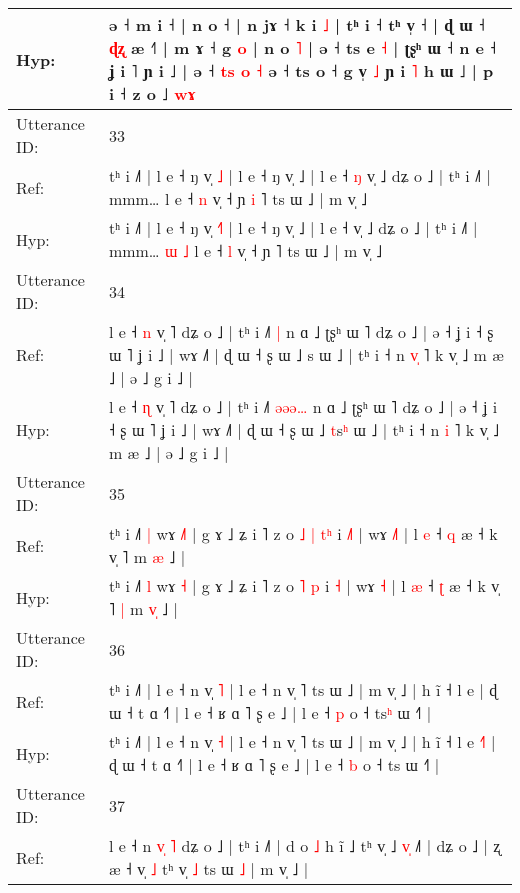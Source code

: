 \documentclass[10pt]{article}
\DeclareRobustCommand{\hl}[1]{{\textcolor{red}{#1}}}
\begin{document}
\begin{longtable}{ll}
 \\
Hyp: & ə ˧ m i ˧ | n o ˧ | n jɤ ˧ k i \hl{˩} | tʰ i ˧ tʰ v̩ ˧ | ɖ ɯ ˧ \hl{ɖ}\hl{ʐ} æ ˧˥ | m ɤ ˧ g\hl{}\hl{}\hl{} \hl{o} | n o \hl{˥} | ə ˧ ts e \hl{˧} | ʈʂʰ ɯ ˧ n e ˧ ʝ i ˥ ɲ i ˩ | ə ˧ \hl{}\hl{t}\hl{s} \hl{o} \hl{˧} ə ˧ ts o ˧ g v̩ \hl{˩} ɲ i \hl{˥} h ɯ ˩ | p i ˧ z o ˩ \hl{w}\hl{ɤ}
 \\
\midrule
Utterance ID: & 33 \\
Ref: & tʰ i ˩˥ | l e ˧ ŋ v̩ \hl{}\hl{˩} | l e ˧ ŋ v̩ ˩ | l e ˧\hl{ }\hl{ŋ} v̩ ˩ dʑ o ˩ | tʰ i ˩˥ | mmm…\hl{}\hl{}\hl{}\hl{} l e ˧ \hl{n} v̩ ˧ ɲ\hl{ }\hl{i} ˥ ts ɯ ˩ | m v̩ ˩
 \\
Hyp: & tʰ i ˩˥ | l e ˧ ŋ v̩ \hl{˧}\hl{˥} | l e ˧ ŋ v̩ ˩ | l e ˧\hl{}\hl{} v̩ ˩ dʑ o ˩ | tʰ i ˩˥ | mmm…\hl{ }\hl{ɯ}\hl{ }\hl{˩} l e ˧ \hl{l} v̩ ˧ ɲ\hl{}\hl{} ˥ ts ɯ ˩ | m v̩ ˩
 \\
\midrule
Utterance ID: & 34 \\
Ref: & l e ˧ \hl{n} v̩ ˥ dʑ o ˩ | tʰ i ˩˥ \hl{}\hl{}\hl{}\hl{|} n ɑ ˩ ʈʂʰ ɯ ˥ dʑ o ˩ | ə ˧ ʝ i ˧ ʂ ɯ ˥ ʝ i ˩ | wɤ ˩˥ | ɖ ɯ ˧ ʂ ɯ ˩ \hl{}s\hl{} ɯ ˩ | tʰ i ˧ n \hl{v}\hl{̩} ˥ k v̩ ˩ m æ ˩ | ə ˩ g i ˩ |
 \\
Hyp: & l e ˧ \hl{ɳ} v̩ ˥ dʑ o ˩ | tʰ i ˩˥ \hl{ə}\hl{ə}\hl{ə}\hl{…} n ɑ ˩ ʈʂʰ ɯ ˥ dʑ o ˩ | ə ˧ ʝ i ˧ ʂ ɯ ˥ ʝ i ˩ | wɤ ˩˥ | ɖ ɯ ˧ ʂ ɯ ˩ \hl{t}s\hl{ʰ} ɯ ˩ | tʰ i ˧ n \hl{}\hl{i} ˥ k v̩ ˩ m æ ˩ | ə ˩ g i ˩ |
 \\
\midrule
Utterance ID: & 35 \\
Ref: & tʰ i ˩˥ \hl{|} wɤ \hl{˩}\hl{˥} | g ɤ ˩ ʑ i ˥ z o\hl{ }\hl{˩} \hl{|} \hl{t}\hl{ʰ} i \hl{˩}\hl{˥} | wɤ \hl{˩}\hl{˥} | l \hl{e} ˧ \hl{q} æ ˧ k v̩ ˥\hl{}\hl{} m \hl{}\hl{æ} ˩ |
 \\
Hyp: & tʰ i ˩˥ \hl{l} wɤ \hl{}\hl{˧} | g ɤ ˩ ʑ i ˥ z o\hl{}\hl{} \hl{˥} \hl{}\hl{p} i \hl{}\hl{˧} | wɤ \hl{}\hl{˧} | l \hl{æ} ˧ \hl{ʈ} æ ˧ k v̩ ˥\hl{ }\hl{|} m \hl{v}\hl{̩} ˩ |
 \\
\midrule
Utterance ID: & 36 \\
Ref: & tʰ i ˩˥ | l e ˧ n v̩ \hl{˥} | l e ˧ n v̩ ˥ ts ɯ ˩ | m v̩ ˩ | h ĩ ˧ l e\hl{}\hl{}\hl{} | ɖ ɯ ˧ t ɑ ˧˥ | l e ˧ ʁ ɑ ˥ ʂ e ˩ | l e ˧ \hl{p} o ˧ ts\hl{ʰ} ɯ ˧˥ |
 \\
Hyp: & tʰ i ˩˥ | l e ˧ n v̩ \hl{˧} | l e ˧ n v̩ ˥ ts ɯ ˩ | m v̩ ˩ | h ĩ ˧ l e\hl{ }\hl{˧}\hl{˥} | ɖ ɯ ˧ t ɑ ˧˥ | l e ˧ ʁ ɑ ˥ ʂ e ˩ | l e ˧ \hl{b} o ˧ ts\hl{} ɯ ˧˥ |
 \\
\midrule
Utterance ID: & 37 \\
Ref: & l e ˧ n \hl{v}\hl{̩} \hl{˥} dʑ o ˩ | tʰ i ˩˥ | d o \hl{˩} h ĩ ˩ tʰ v̩ ˩\hl{ }\hl{v}\hl{̩} ˩˥ | dʑ o ˩ | ʐ æ ˧ v̩\hl{}\hl{} \hl{˩} tʰ v̩ \hl{˩} ts ɯ \hl{˩} | m v̩ ˩ |

\end{longtable}
\end{document}
